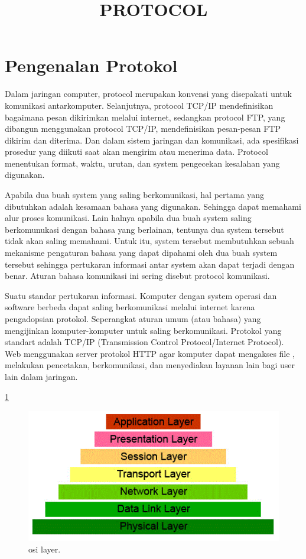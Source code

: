 \documentclass{article}
\title{PROTOCOL}
\author{}
\date{}
\begin{document}
\maketitle

\section{Pengenalan Protokol} 

Dalam jaringan computer, protocol merupakan konvensi yang disepakati untuk komunikasi antarkomputer. Selanjutnya, protocol TCP/IP 
mendefinisikan bagaimana pesan dikirimkan melalui internet, sedangkan protocol FTP, yang dibangun menggunakan protocol TCP/IP, 
mendefinisikan pesan-pesan FTP dikirim dan diterima. Dan dalam sistem jaringan dan komunikasi, ada spesifikasi prosedur yang diikuti 
saat akan mengirim atau menerima data. Protocol menentukan format, waktu, urutan, dan system pengecekan kesalahan yang digunakan.

Apabila dua buah system yang saling berkomunikasi, hal pertama yang dibutuhkan adalah kesamaan bahasa yang digunakan. Sehingga dapat 
memahami alur proses komunikasi. Lain halnya apabila dua buah system saling berkomunukasi dengan bahasa yang berlainan, tentunya dua 
system tersebut tidak akan saling memahami. Untuk itu, system tersebut membutuhkan sebuah mekanisme pengaturan bahasa yang dapat 
dipahami oleh dua buah system tersebut sehingga pertukaran informasi antar system akan dapat terjadi dengan benar. Aturan bahasa 
komunikasi ini sering disebut protocol komunikasi. 
 
Suatu standar pertukaran informasi. Komputer dengan system operasi dan software berbeda dapat saling berkomunikasi melalui internet 
karena pengadopsian protokol. Seperangkat aturan umum (atau bahasa) yang mengijinkan komputer-komputer untuk saling berkomunikasi. 
Protokol yang standart adalah TCP/IP (Transmission Control Protocol/Internet Protocol). Web menggunakan server protokol HTTP agar 
komputer dapat mengakses file , melakukan pencetakan, berkomunikasi, dan menyediakan layanan lain bagi user lain dalam jaringan.
 
 \ref{layer} 
    \begin{figure}[ht] 
    \centerline{\includegraphics[width=1\textwidth]{figures/layer.JPG}} 
    \caption{osi layer.} 
    \label{layer} 
    \end{figure}
    
\end{document}
